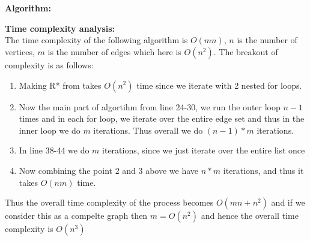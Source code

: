 \documentclass{article}
\begin{document}
\\\\
\textbf{Algorithm:}

\textbf{Time complexity analysis:}\\
The time complexity of the following algorithm is $O(mn)$, $n$ is the number of vertices, $m$ is the number of edges which here is $O(n^2)$. The breakout of complexity is as follows:
\begin{enumerate}
    \item Making R* from takes $O(n^2)$ time since we iterate with 2 nested for loops.
    \item Now the main part of algortihm from line 24-30, we run the outer loop $n-1$ times and in each for loop, we iterate over the entire edge set and thus in the inner loop we do $m$ iterations. Thus overall we do $(n-1)*m$ iterations.
    \item In line 38-44 we do $m$ iterations, since we just iterate over the entire list once
    \item Now combining the point 2 and 3 above we have $n*m$ iterations, and thus it takes $O(nm)$ time.
\end{enumerate}
Thus the overall time complexity of the process becomes $O(mn + n^2)$ and if we consider this as a compelte graph then $m = O(n^2)$ and hence the overall time complexity is $O(n^3)$
\end{document}
